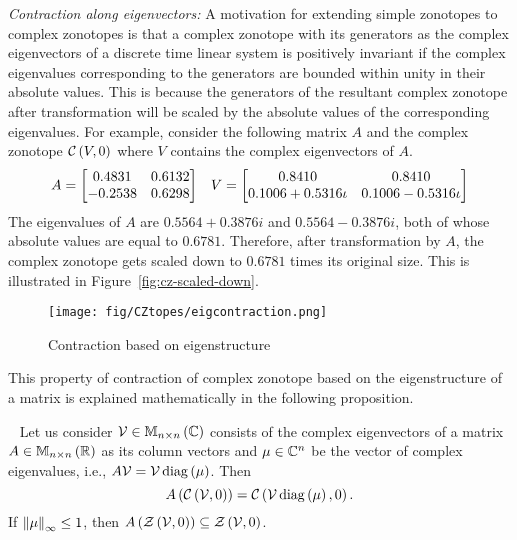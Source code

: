 \emph{Contraction along eigenvectors:  }  A motivation for extending
simple zonotopes to complex zonotopes is that a complex zonotope with
its generators as the complex eigenvectors of a discrete time linear
system is positively invariant if the complex eigenvalues
corresponding to the generators are bounded within unity in their
absolute values.  This is because the generators of the resultant
complex zonotope after transformation will be scaled by the absolute
values of the corresponding eigenvalues.  For example, consider the
following matrix $A$ and the complex zonotope
$\mathit{\mathcal{C}}\left(V,0\right)$ where $V$ contains the complex eigenvectors of $A$.
%
\begin{align*}
& A=\left[\begin{matrix}
0.4831 &  0.6132\\
-0.2538  &  0.6298      
\end{matrix}\right]
& V=\left[\begin{matrix}0.8410 & 0.8410 \\ 0.1006+0.5316\iota & 0.1006-0.5316\iota\end{matrix}\right]
\end{align*}
%
The eigenvalues of $A$ are $0.5564 + 0.3876i$ and $0.5564 - 0.3876i$,
both of whose absolute values are equal to $0.6781$.
Therefore, after transformation by $A$, the complex zonotope gets
scaled down to $0.6781$ times its original size.  This is illustrated
in Figure~\ref{fig:cz-scaled-down}.
%
\begin{figure}
\center
\texttt{[image: fig/CZtopes/eigcontraction.png]}
\caption{Contraction based on eigenstructure}
\end{figure}
%
This property of contraction of complex zonotope based on the
eigenstructure of a matrix is explained mathematically in the
following proposition.
%
\begin{proposition}~\label{lem:eig-invariance}
Let us consider $\mathcal{V}\in\mathbb{M}_{n\times n}\left(\mathbb{C}\right)$ consists of the
complex eigenvectors of a matrix $A\in\mathbb{M}_{n\times n}\left(\mathbb{R}\right)$ as its
column vectors and $\mu\in\mathbb{C}^n$ be the vector of complex
eigenvalues, i.e., $A\mathcal{V} = \mathcal{V}\operatorname{diag}\left(\mu\right)$.
Then \[A\left(\mathit{\mathcal{C}}\left(\mathcal{V},0\right)\right)
= \mathit{\mathcal{C}}\left(\mathcal{V}\operatorname{diag}\left({\mu}\right),0\right).\]  If
$\left\|\mu\right\|_{\infty}\leq 1$, then
$A\left(\mathit{\mathcal{Z}}\left(\mathcal{V},0\right)\right)\subseteq \mathit{\mathcal{Z}}\left(\mathcal{V},0\right)$.
\end{proposition}
% 
